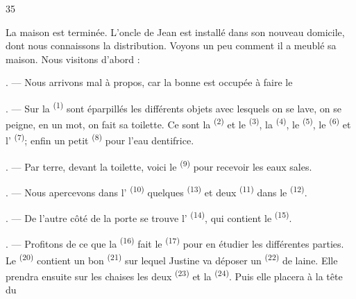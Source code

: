 \begin{VUpage}[37]{35}
\VUsaut{6.0mm}
\VUsaut{1.4mm}
\VUsaut{0.4mm}
\VUsaut{2.2mm}

\VUblancAlinea
La maison est terminée. L'oncle de Jean est installé\nl
dans son nouveau domicile, dont nous connaissons la\nl
distribution. Voyons un peu comment il a meublé sa\nl
maison. Nous visitons d'abord :

\VUsaut{3.0mm}

. --- Nous arrivons mal à propos, car la bonne est\nl
occupée à faire le 

. --- Sur la  \textsuperscript{(1)} sont éparpillés\nl
les différents objets avec lesquels on se lave, on se\nl
peigne, en un mot, on fait sa toilette. Ce sont la\nl
{} \textsuperscript{(2)} et le  \textsuperscript{(3)}, la \cc
{} \textsuperscript{(4)}, le  \textsuperscript{(5)}, le  \textsuperscript{(6)} et l' \textsuperscript{(7)};\nl
enfin un petit  \textsuperscript{(8)} pour l'eau dentifrice.

. --- Par terre, devant la toilette, voici le  \textsuperscript{(9)}\nl
pour recevoir les eaux sales.

. --- Nous apercevons dans l' \textsuperscript{(10)}\nl
quelques  \textsuperscript{(13)} et deux  \textsuperscript{(11)}\nl
dans le  \textsuperscript{(12)}.

. --- De l'autre côté de la porte se trouve\nl
l' \textsuperscript{(14)}, qui contient le  \textsuperscript{(15)}.

. --- Profitons de ce que la  \textsuperscript{(16)}\nl
fait le  \textsuperscript{(17)} pour en étudier les différentes parties.\nl
Le  \textsuperscript{(20)} contient un bon  \textsuperscript{(21)} sur\nl
lequel Justine va déposer un  \textsuperscript{(22)} de laine.\nl
Elle prendra ensuite sur les chaises les deux  \textsuperscript{(23)}\nl
et la  \textsuperscript{(24)}. Puis elle placera à la tête du
\parplein
\end{VUpage}


